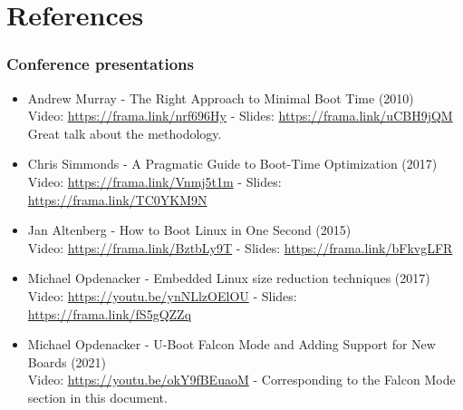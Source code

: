 \section{References}

\begin{frame}
\frametitle{Conference presentations}
\small
\begin{itemize}
\item Andrew Murray - The Right Approach to Minimal Boot Time (2010) \\
      Video: \url{https://frama.link/nrf696Hy} - Slides: \url{https://frama.link/uCBH9jQM} \\
      Great talk about the methodology.
\item Chris Simmonds - A Pragmatic Guide to Boot-Time Optimization (2017)\\
      Video: \url{https://frama.link/Vnmj5t1m} - Slides: \url{https://frama.link/TC0YKM9N}
\item Jan Altenberg - How to Boot Linux in One Second (2015)\\
      Video: \url{https://frama.link/BztbLy9T} - Slides: \url{https://frama.link/bFkvgLFR}
\item Michael Opdenacker - Embedded Linux size reduction techniques (2017)\\
      Video: \url{https://youtu.be/ynNLlzOElOU} - Slides: \url{https://frama.link/fS5gQZZq}
\item Michael Opdenacker - U-Boot Falcon Mode and Adding Support for New Boards (2021)\\
      Video: \url{https://youtu.be/okY9fBEuaoM} - Corresponding to the Falcon Mode section in this document.
\end{itemize}
\end{frame}
